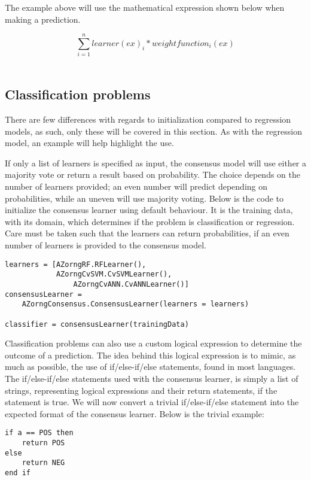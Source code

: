 \documentclass[12pt]{article}
\begin{document}
The example above will use the mathematical expression shown below when making a prediction.

\begin{equation}
  \sum_{i=1}^n learner(ex)_i*weightfunction_i(ex)
\end{equation}
\\


\newpage
\subsection{Classification problems}

There are few differences with regards to initialization compared to regression
models, as such, only these will be covered in this section. As with the regression
model, an example will help highlight the use.

If only a list of learners is specified as input, the consensus model will use
either a majority vote or return a result based on probability. The choice depends
on the number of learners provided; an even number will predict depending on probabilities,
while an uneven will use majority voting. Below is the code to initialize the consensus
learner using default behaviour. It is the training data, with its domain, which determines
if the problem is classification or regression. Care must be taken such that the learners
can return probabilities, if an even number of learners is provided to the consensus model.

\begin{verbatim}
learners = [AZorngRF.RFLearner(), 
            AZorngCvSVM.CvSVMLearner(),
	            AZorngCvANN.CvANNLearner()]
consensusLearner = 
    AZorngConsensus.ConsensusLearner(learners = learners)

classifier = consensusLearner(trainingData)
\end{verbatim}

\newpage
Classification problems can also use a custom logical expression to determine the outcome
of a prediction. The idea behind this logical expression is to mimic, as much as possible,
the use of if/else-if/else statements, found in most languages. The if/else-if/else
statements used with the consensus learner, is simply a list of strings, representing
logical expressions and their return statements, if the statement is true. We will now
convert a trivial if/else-if/else statement into the expected format of the consensus 
learner. Below is the trivial example:

\begin{verbatim}
if a == POS then
    return POS
else
    return NEG
end if
\end{verbatim}
\end{document}
